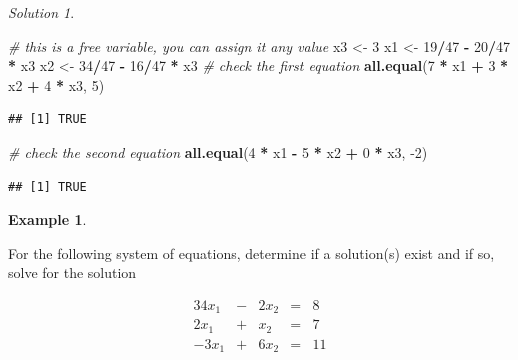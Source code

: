 \documentclass[
]{book}
\newenvironment{Shaded}{\begin{snugshade}}{\end{snugshade}}
\newcommand{\CommentTok}[1]{\textcolor[rgb]{0.56,0.35,0.01}{\textit{#1}}}
\newcommand{\DecValTok}[1]{\textcolor[rgb]{0.00,0.00,0.81}{#1}}
\newcommand{\KeywordTok}[1]{\textcolor[rgb]{0.13,0.29,0.53}{\textbf{#1}}}
\newcommand{\NormalTok}[1]{#1}
\newcommand{\OperatorTok}[1]{\textcolor[rgb]{0.81,0.36,0.00}{\textbf{#1}}}
\newcommand{\StringTok}[1]{\textcolor[rgb]{0.31,0.60,0.02}{#1}}
\theoremstyle{definition}
\theoremstyle{definition}
\newtheorem{example}{Example}[chapter]
\theoremstyle{definition}
\theoremstyle{remark}
\newtheorem*{solution}{Solution}
\begin{document}
\begin{solution}
\begin{Shaded}
\begin{Highlighting}[]
\CommentTok{# this is a free variable, you can assign it any value}
\NormalTok{x3 <-}\StringTok{ }\DecValTok{3}
\NormalTok{x1 <-}\StringTok{ }\DecValTok{19}\OperatorTok{/}\DecValTok{47} \OperatorTok{-}\StringTok{ }\DecValTok{20}\OperatorTok{/}\DecValTok{47} \OperatorTok{*}\StringTok{ }\NormalTok{x3}
\NormalTok{x2 <-}\StringTok{ }\DecValTok{34}\OperatorTok{/}\DecValTok{47} \OperatorTok{-}\StringTok{ }\DecValTok{16}\OperatorTok{/}\DecValTok{47} \OperatorTok{*}\StringTok{ }\NormalTok{x3}
\CommentTok{# check the first equation}
\KeywordTok{all.equal}\NormalTok{(}\DecValTok{7} \OperatorTok{*}\StringTok{ }\NormalTok{x1 }\OperatorTok{+}\StringTok{ }\DecValTok{3} \OperatorTok{*}\StringTok{ }\NormalTok{x2 }\OperatorTok{+}\StringTok{ }\DecValTok{4} \OperatorTok{*}\StringTok{ }\NormalTok{x3, }\DecValTok{5}\NormalTok{)}
\end{Highlighting}
\end{Shaded}

\begin{verbatim}
## [1] TRUE
\end{verbatim}

\begin{Shaded}
\begin{Highlighting}[]
\CommentTok{# check the second equation}
\KeywordTok{all.equal}\NormalTok{(}\DecValTok{4} \OperatorTok{*}\StringTok{ }\NormalTok{x1 }\OperatorTok{-}\StringTok{ }\DecValTok{5} \OperatorTok{*}\StringTok{ }\NormalTok{x2 }\OperatorTok{+}\StringTok{ }\DecValTok{0} \OperatorTok{*}\StringTok{ }\NormalTok{x3, }\DecValTok{-2}\NormalTok{)}
\end{Highlighting}
\end{Shaded}

\begin{verbatim}
## [1] TRUE
\end{verbatim}

\end{solution}

\begin{example}
\protect\hypertarget{exm:unlabeled-div-52}{}\label{exm:unlabeled-div-52}

For the following system of equations, determine if a solution(s) exist and if so, solve for the solution

\begin{alignat*}{3}
4 x_1 & {}-{} & 2 x_2 & {}={} & 8\\
2 x_1 & {}+{} & x_2 & {}={} & 7 \\
-3 x_1 & {}+{} & 6 x_2 &{}={} & 11
\end{alignat*}

\end{example}
\end{document}
